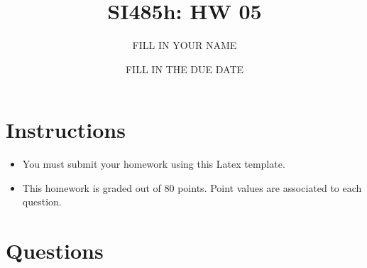 \documentclass{article}[9pt]
\title{SI485h: HW 05}
\date{FILL IN THE DUE DATE}
\author{FILL IN YOUR NAME}
\begin{document}
\maketitle
\section*{Instructions}

\begin{itemize}
\item You must submit your homework using this Latex template.
\item This homework is graded out of 80 points. Point values are associated to each question.
\end{itemize}

\section*{Questions}
\label{sec:org8c89f79}
\end{document}
